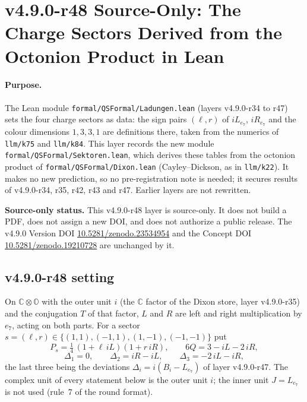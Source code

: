\clearpage
\section*{v4.9.0-r48 Source-Only: The Charge Sectors Derived from the Octonion Product in Lean}
\label{sec:v490-r48-sectors-formal}

\paragraph{Purpose.}
The Lean module \texttt{formal/QSFormal/Ladungen.lean} (layers v4.9.0-r34 to r47) sets the four charge sectors as data: the sign pairs
\((\ell,r)\) of \(iL_{e_7}\), \(iR_{e_7}\) and the colour dimensions \(1,3,3,1\) are definitions there, taken from the numerics of
\texttt{llm/k75} and \texttt{llm/k84}.  This layer records the new module \texttt{formal/QSFormal/Sektoren.lean}, which derives these tables
from the octonion product of \texttt{formal/QSFormal/Dixon.lean} (Cayley--Dickson, as in \texttt{llm/k22}).  It makes no new prediction,
so no pre-registration note is needed; it secures results of v4.9.0-r34, r35, r42, r43 and r47.  Earlier layers are not rewritten.

\noindent\textbf{Source-only status.}
This v4.9.0-r48 layer is source-only.  It does not build a PDF, does not assign a new DOI,
and does not authorize a public release.  The v4.9.0 Version DOI
\href{https://doi.org/10.5281/zenodo.23534954}{10.5281/zenodo.23534954} and the Concept DOI
\href{https://doi.org/10.5281/zenodo.19210728}{10.5281/zenodo.19210728} are unchanged by it.

\subsection*{v4.9.0-r48 setting}
\label{subsec:v490-r48-setting}

On \(\mathbb C\otimes\mathbb O\) with the outer unit \(i\) (the \(\mathbb C\) factor of the Dixon store, layer v4.9.0-r35) and the
conjugation \(T\) of that factor, \(L\) and \(R\) are left and right multiplication by \(e_7\), acting on both parts.  For a sector
\(s=(\ell,r)\in\{(1,1),(-1,1),(1,-1),(-1,-1)\}\) put
\[
P_s=\tfrac14\,(1+\ell\, iL)(1+r\, iR),\qquad 6Q=3-iL-2\,iR,
\]
\[
\Delta_1=0,\qquad \Delta_2=iR-iL,\qquad \Delta_3=-2\,iL-iR,
\]
the last three being the deviations \(\Delta_i=i(B_i-L_{e_7})\) of layer v4.9.0-r47.  The complex unit of every statement below is the outer
unit \(i\); the inner unit \(J=L_{e_7}\) is not used (rule~7 of the round format).

